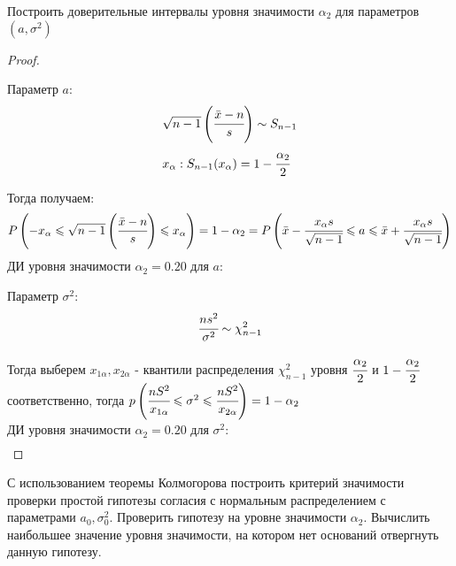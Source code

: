 \begin{problem}
	Построить доверительные интервалы уровня значимости $\alpha_2$ для параметров $(a, \sigma^2)$ 	
\end{problem}

\begin{proof}
	$ $
	
	Параметр $a$:
	\begin{align}
		& \sqrt{n-1}\left(\cfrac{\bar{x}-n}{s}\right)\sim S_{n-1} \\
		& x_{\alpha}:S_{n-1}(x_{\alpha})=1-\cfrac{\alpha_2}{2}
	\end{align}

	Тогда получаем:
	\begin{equation}
		P\left(-x_{\alpha}\leqslant\sqrt{n-1}\left(\cfrac{\bar{x}-n}{s}\right)\leqslant x_{\alpha}\right)=1-\alpha_2=P\left(\bar{x}-\cfrac{x_{\alpha}s}{\sqrt{n-1}}\leqslant a\leqslant\bar{x}+\cfrac{x_{\alpha}s}{\sqrt{n-1}}\right)
	\end{equation}
	ДИ уровня значимости $\alpha_2=0.20$ для $a$:
	\begin{equation}
		[2.9997; 3.0235]
	\end{equation}

	Параметр $\sigma^2$:
	\begin{equation}
		\cfrac{ns^2}{\sigma^2}\sim \chi^2_{n-1}
	\end{equation}

	Тогда выберем $x_{1\alpha}, x_{2\alpha}$ - квантили распределения $\chi^2_{n-1}$ уровня $\cfrac{\alpha_2}2$ и $1-\cfrac{\alpha_2}2$ соответственно, тогда $p\left(\cfrac{nS^2}{x_{1\alpha}}\leqslant \sigma^2 \leqslant \cfrac{nS^2}{x_{2\alpha}}\right)=1-\alpha_2$ \\
	ДИ уровня значимости $\alpha_2=0.20$ для $\sigma^2$: 
	\begin{align}
		[0.0078178; 0.0131728]
	\end{align}
\end{proof}


\begin{problem}
	С использованием теоремы Колмогорова построить критерий значимости проверки простой гипотезы согласия с нормальным распределением с параметрами $a_0, \sigma_0^2$. Проверить гипотезу на уровне значимости $\alpha_2$. Вычислить наибольшее значение уровня значимости, на котором нет оснований отвергнуть данную гипотезу.
\end{problem}

